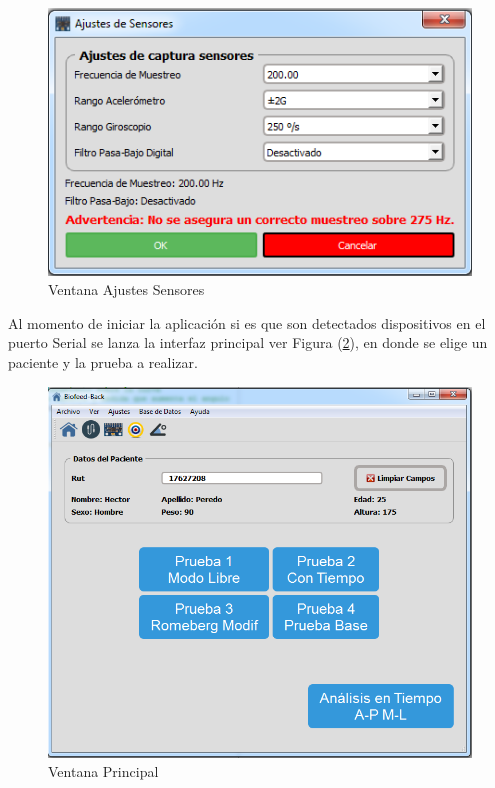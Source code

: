 \documentclass[12pt,a4paper]{article}
\begin{document}
\begin{figure}[H]
	\centering
	\includegraphics[scale=0.6]{images/ajustesSensores}
	\caption{Ventana Ajustes Sensores}
	\label{fig:ajustessensores}
\end{figure}

Al momento de iniciar la aplicación si es que son detectados dispositivos en el puerto Serial se lanza la interfaz principal ver Figura (\ref{fig:mainwindow}), en donde se elige un paciente y la prueba a realizar.

\begin{figure}[H]
	\centering
	\includegraphics[scale=0.6]{images/mainwindow}
	\caption{Ventana Principal}
	\label{fig:mainwindow}
\end{figure}
\end{document}
